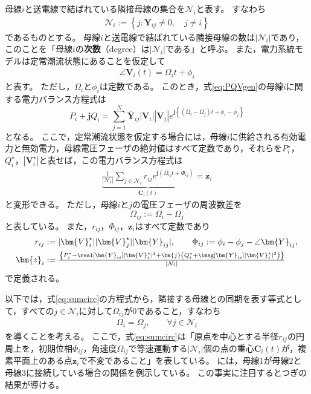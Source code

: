 \documentclass[tombow,dvipdfmx]{corona-a5-1.1}
\begin{document}
母線$i$と送電線で結ばれている隣接母線の集合を$\mathcal{N}_i$と表す。
すなわち
\begin{align*}
\mathcal{N}_i:=
\left\{
j : \bm{Y}_{ij} \neq 0,\quad j \neq i
\right\}
\end{align*}
であるものとする。
母線$i$と送電線で結ばれている隣接母線の数は$|\mathcal{N}_i|$であり，このことを「母線$i$の\textbf{次数}（degree）は$|\mathcal{N}_i|$である」と呼ぶ。
また，電力系統モデルは定常潮流状態にあることを仮定して
\begin{align*}
\angle \bm{V}_i (t) = \Omega_i t +\phi_i
\end{align*}
と表す。
ただし，$\Omega_i$と$\phi_i$は定数である。
このとき，式\ref{eq:PQVgen}の母線$i$に関する電力バランス方程式は
\[
P_i + \bm{j} Q_i = \sum_{j=1}^N \overline{\bm{Y}}_{ij} |\bm{V}_i| |\bm{V}_j|
e^{\bm{j} \left\{ ( \Omega_i - \Omega_j )t + \phi_i -\phi_j \right\}}
\]
となる。
ここで，定常潮流状態を仮定する場合には，母線$i$に供給される有効電力と無効電力，母線電圧フェーザの絶対値はすべて定数であり，それらを$P_i^{\star}$，$Q_i^{\star}$，$|\bm{V}_i^{\star}|$と表せば，この電力バランス方程式は
\begin{align}\label{eq:sumcirc}
\underbrace{
\frac{1}{|\mathcal{N}_i|}\sum_{j \in \mathcal{N}_i } 
r_{ij}
e^{\bm{j} 
\left(
\Omega_{ij}t + 
\Phi_{ij}
\right) }
}_{\bm{C}_i (t)}
= \bm{z}_i
\end{align}
と変形できる。
ただし，母線$i$と$j$の電圧フェーザの周波数差を
\[
\Omega_{ij}:=\Omega_{i}-\Omega_{j}
\]
と表している。
また，$r_{ij}$，$\Phi_{ij}$，$\bm{z}_i$はすべて定数であり
\begin{align*}
r_{ij} &:=|\bm{V}_i^{\star}| |\bm{V}_j^{\star}| |\bm{Y}_{ij}|, \qquad
\Phi_{ij} := \phi_i - \phi_j - \angle \bm{Y}_{ij},
\\
\bm{z}_i &:=  \tfrac{
\left\{
P_i^{\star} - \real[\bm{Y}_{ii}] |\bm{V}_i^{\star}|^2
+ \bm{j}
\left(
Q_i^{\star} + \imag [\bm{Y}_{ii}] |\bm{V}_i^{\star}|^2
\right)
\right\}
}
{|\mathcal{N}_i|}
\end{align*}
で定義される。

以下では，式\ref{eq:sumcirc}の方程式から，隣接する母線との同期を表す等式として，すべての$j\in \mathcal{N}_i$に対して$\Omega_{ij}$が0であること，すなわち
\begin{align}\label{eq:alloms}
\Omega_i = \Omega_{j} 
,\qquad 
\forall j\in \mathcal{N}_i
\end{align}
を導くことを考える。
ここで，式\ref{eq:sumcirc}は「原点を中心とする半径$r_{ij}$の円周上を，初期位相$\Phi_{ij}$，角速度$\Omega_{ij}$で等速運動する$|\mathcal{N}_i|$個の点の重心$\bm{C}_i (t)$が，複素平面上のある点$\bm{z}_i$で不変であること」を表している。
には，母線$1$が母線$2$と母線$3$に接続している場合の関係を例示している。
この事実に注目するとつぎの結果が導ける。
\end{document}

